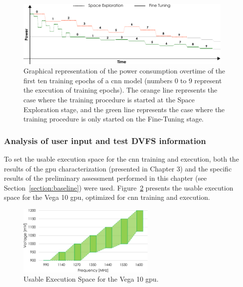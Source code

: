 \begin{figure}[htb]
    \centering
        \includegraphics[width=0.95\textwidth]{Figures/Application To Deep Learning/comparacao.pdf}
        \caption{Graphical representation of the power consumption overtime of the first ten training epochs of a \acrshort{cnn} model (numbers 0 to 9 represent the execution of training epochs). The orange line represents the case where the training procedure is started at the Space Exploration stage, and the green line represents the case where the training procedure is only started on the Fine-Tuning stage.}
    \label{fig:comp}
\end{figure}




\subsubsection{Analysis of user input and test DVFS information}

To set the usable execution space for the \acrshort{cnn} training and execution, both the results of the \acrshort{gpu} characterization (presented in Chapter 3) and the specific results of the preliminary assessment performed in this chapter (see Section~\ref{section:baseline}) were used. Figure~\ref{fig:ues} presents the usable execution space for the Vega 10 \acrshort{gpu}, optimized for  \acrshort{cnn} training and execution.

\begin{figure}[htb]
    \centering
        \includegraphics[width=0.6\textwidth]{Figures/Application To Deep Learning/UES.pdf}
        \caption{Usable Execution Space for the Vega 10 \acrshort{gpu}.}
    \label{fig:ues}
\end{figure}



